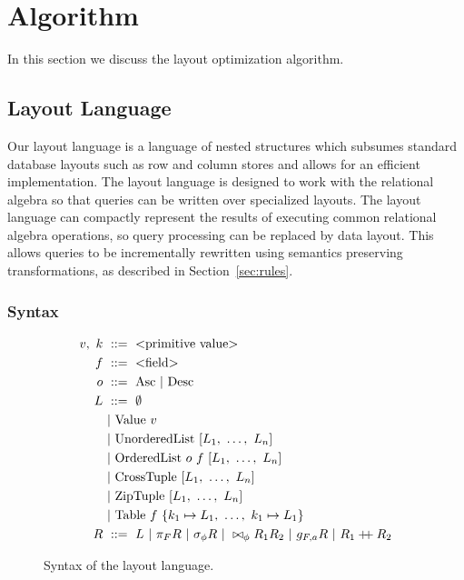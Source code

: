 \section{Algorithm}

In this section we discuss the layout optimization algorithm.

\subsection{Layout Language}

Our layout language is a language of nested structures which subsumes standard
database layouts such as row and column stores and allows for an efficient
implementation.
The layout language is designed to work with the relational algebra so that
queries can be written over specialized layouts.
The layout language can compactly represent the results of executing common
relational algebra operations, so query processing can be replaced by data
layout.
This allows queries to be incrementally rewritten using semantics preserving
transformations, as described in Section~\ref{sec:rules}.

\subsubsection{Syntax}

\begin{figure}
  \begin{align*}
    v,\ k\ &::=\ \text{<primitive value>} \\
    f\ &::=\ \text{<field>} \\
    o\ &::=\ \text{Asc}\ |\ \text{Desc} \\
    L\ &::=\ \emptyset \\
           &|\ \text{Value}\ v \\
           &|\ \text{UnorderedList}\ [L_1,\ \dots,\ L_n] \\
           &|\ \text{OrderedList}\ o\ f\ [L_1,\ \dots,\ L_n] \\
           &|\ \text{CrossTuple}\ [L_1,\ \dots,\ L_n] \\
           &|\ \text{ZipTuple}\ [L_1,\ \dots,\ L_n] \\
           &|\ \text{Table}\ f\ \{k_1 \mapsto L_1,\ \dots,\ k_1 \mapsto L_1\}\\
    R\ &::=\ L\ |\ \pi_F R\ |\ \sigma_\phi R\ |\ \bowtie_\phi R_1 R_2\ |\ g_{F,a} R\ |\ R_1 \mathbin{+\!\!+} R_2
  \end{align*}
  \caption{Syntax of the layout language.}
\end{figure}

